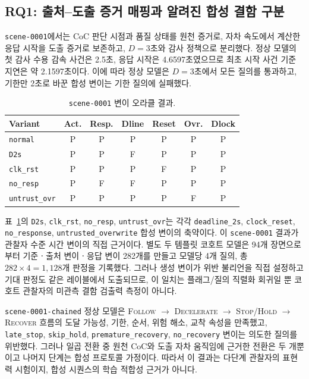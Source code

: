\subsection{RQ1: 출처--도출 증거 매핑과 알려진 합성 결함 구분}
\label{sec:results-rq1}

\texttt{scene-0001}에서는 CoC 판단 시점과 품질 상태를 원천 증거로, 자차 속도에서 계산한 응답 시작을 도출 증거로 보존하고, $D=3$초와  감사 정책으로 분리했다. 정상 모델의 첫 감사 수용 감속 사건은 2.5초, 응답 시작은 4.6597초였으므로 최초 시작 사건 기준 지연은 약 2.1597초이다. 이에 따라 정상 모델은 $D=3$초에서 모든 질의를 통과하고, 기한만 2초로 바꾼 합성 변이는 기한 질의에 실패했다.

\begin{table}[!htbp]
\centering
\caption{\texttt{scene-0001} 변이 오라클 결과.}
\label{tab:scene1-results}
\scriptsize
\setlength{\tabcolsep}{2.5pt}
\begin{tabular}{lcccccc}
\toprule
Variant & Act. & Resp. & Dline & Reset & Ovr. & Dlock \\
\midrule
\texttt{normal} & P & P & P & P & P & P \\
\texttt{D2s} & P & P & F & P & P & P \\
\texttt{clk\_rst} & P & P & P & F & P & P \\
\texttt{no\_resp} & P & F & F & P & P & P \\
\texttt{untrust\_ovr} & P & P & P & P & F & P \\
\bottomrule
\end{tabular}
\end{table}

표~\ref{tab:scene1-results}의 \texttt{D2s}, \texttt{clk\_rst}, \texttt{no\_resp}, \texttt{untrust\_ovr}는 각각 \texttt{deadline\_2s}, \texttt{clock\_reset}, \texttt{no\_response}, \texttt{untrusted\_overwrite} 합성 변이의 축약이다. 이 \texttt{scene-0001} 결과가 관찰자 수준 시간 변이의 직접 근거이다. 별도 두 템플릿 코호트 모델은 94개 장면으로부터 기준ㆍ출처 변이ㆍ응답 변이 282개를 만들고 모델당 4개 질의, 총 $282 \times 4 = 1{,}128$개 판정을 기록했다. 그러나 생성 변이가 위반 불리언을 직접 설정하고 기대 판정도 같은 레이블에서 도출되므로, 이 일치는 플래그/질의 직렬화 회귀일 뿐 코호트 관찰자의 미관측 결함 검출력 측정이 아니다.

\texttt{scene-0001-chained} 정상 모델은 \textsc{Follow} $\rightarrow$ \textsc{Decelerate} $\rightarrow$ \textsc{Stop/Hold} $\rightarrow$ \textsc{Recover} 흐름의 도달 가능성, 기한, 순서, 위험 해소, 교착 속성을 만족했고, \texttt{late\_stop}, \texttt{skip\_hold}, \texttt{premature\_recovery}, \texttt{no\_recovery} 변이는 의도한 질의를 위반했다. 그러나 일곱 전환 중 원천 CoC와 도출 자차 움직임에 근거한 전환은 두 개뿐이고 나머지 단계는 합성 프로토콜 가정이다. 따라서 이 결과는 다단계 관찰자의 표현력 시험이지, 합성 시퀀스의 학습 적합성 근거가 아니다.

